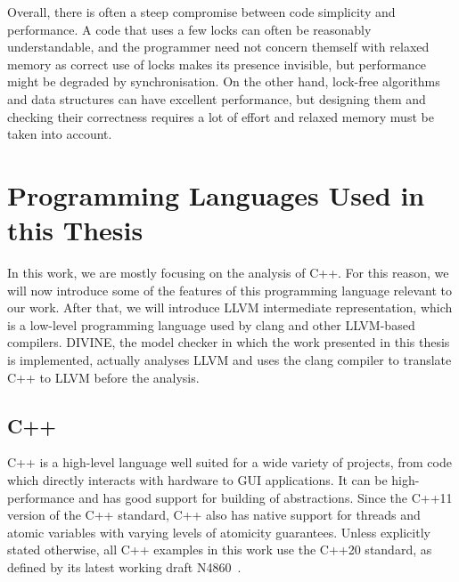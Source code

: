 Overall, there is often a steep compromise between code simplicity and
performance.
A code that uses a few locks can often be reasonably understandable, and the
programmer need not concern themself with relaxed memory as correct use of
locks makes its presence invisible, but performance might be degraded by
synchronisation.
On the other hand, lock-free algorithms and data structures can have excellent
performance, but designing them and checking their correctness requires a lot
of effort and relaxed memory must be taken into account.

% 


\section{Programming Languages Used in this Thesis}

In this work, we are mostly focusing on the analysis of C++.
For this reason, we will now introduce some of the features of this programming language relevant to our work.
After that, we will introduce LLVM intermediate representation, which is a low-level programming language used by clang and other LLVM-based compilers.
DIVINE, the model checker in which the work presented in this thesis is implemented, actually analyses LLVM and uses the clang compiler to translate C++ to LLVM before the analysis.

\subsection{C++}

C++ is a high-level language well suited for a wide variety of projects, from
code which directly interacts with hardware to GUI applications.
It can be high-performance and has good support for building of abstractions.
Since the C++11 version of the C++ standard, C++ also has native support for
threads and atomic variables with varying levels of atomicity guarantees.
Unless explicitly stated otherwise, all C++ examples in this work use the C++20
standard, as defined by its latest working draft N4860~.

